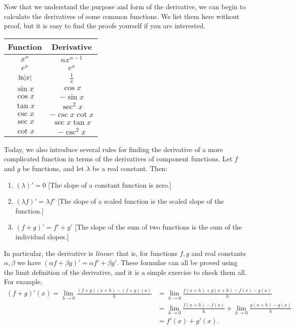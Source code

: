 


Now that we understand the purpose and form of the derivative, we can begin to calculate
the derivatives of some common functions. We list them here without proof, but it is easy
to find the proofs yourself if you are interested.

\begin{center}
  \def\arraystretch{1.5}
  \begin{tabular}{|c|c|}\hline
    \textbf{Function} & \textbf{Derivative}\\\hline
    $ x^n $ & $ nx^{n - 1} $\\\hline
    $ e^x $ & $ e^x $\\\hline
    $ \ln \abs{x} $ & $ \frac{1}{x} $\\\hline
    $ \sin x $ & $ \cos x $\\\hline
    $ \cos x $ & $ -\sin x $\\\hline
    $ \tan x $ & $ \sec^2 x $\\\hline
    $ \csc x $ & $ -\csc x \cot x $\\\hline
    $ \sec x $ & $ \sec x \tan x $\\\hline
    $ \cot x $ & $ -\csc^2 x $\\\hline
  \end{tabular}
\end{center}

Today, we also introduce several rules for finding the derivative of a more complicated function
in terms of the derivatives of component functions. Let $ f $ and $ g $ be functions, and let $ \lambda $ be a real constant. Then:
\begin{enumerate}
  \item $ (\lambda)' = 0 $ [The slope of a constant function is zero.]
  \item $ (\lambda f)' = \lambda f' $ [The slope of a scaled function is the scaled slope of the function.]
  \item $ (f + g)' = f' + g' $ [The slope of the sum of two functions is the sum of the individual slopes.]
\end{enumerate}
In particular, the derivative is \textit{linear}: that is, for functions $ f, g $ and real constants $ \alpha, \beta $
we have $ (\alpha f + \beta g)' = \alpha f' + \beta g' $. These formulae can all be proved using the limit definition
of the derivative, and it is a simple exercise to check them all. For example,
\begin{align*}
  (f + g)'(x) = \lim_{h \to 0} \frac{(f + g)(x + h) - (f + g)(x)}{h} &= \lim_{h \to 0} \frac{f(x + h) + g(x + h) - f(x) - g(x)}{h} \\
                                                                     &= \lim_{h \to 0} \frac{f(x + h) - f(x)}{h} + \lim_{h \to 0} \frac{g(x + h) - g(x)}{h} \\
                                                                     &= f'(x) + g'(x).
\end{align*}

